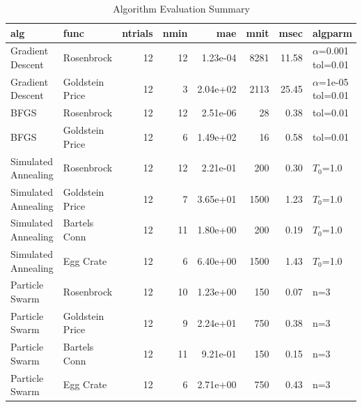\documentclass{vgtc}                          %
\begin{document}
\begin{table}[h]
\caption{Algorithm Evaluation Summary}
\label{tab:algo_eval_sum}
\begin{tabular}{llrrrrrl}
\toprule
                 alg &             func &  ntrials &  nmin &      mae &  mnit &  msec &                  algparm \\
\midrule
    Gradient Descent &       Rosenbrock &       12 &    12 & 1.23e-04 &  8281 & 11.58 &  $\alpha$=0.001 tol=0.01 \\
    Gradient Descent &  Goldstein Price &       12 &     3 & 2.04e+02 &  2113 & 25.45 &  $\alpha$=1e-05 tol=0.01 \\
                BFGS &       Rosenbrock &       12 &    12 & 2.51e-06 &    28 &  0.38 &                 tol=0.01 \\
                BFGS &  Goldstein Price &       12 &     6 & 1.49e+02 &    16 &  0.58 &                 tol=0.01 \\
 Simulated Annealing &       Rosenbrock &       12 &    12 & 2.21e-01 &   200 &  0.30 &                $T_0$=1.0 \\
 Simulated Annealing &  Goldstein Price &       12 &     7 & 3.65e+01 &  1500 &  1.23 &                $T_0$=1.0 \\
 Simulated Annealing &     Bartels Conn &       12 &    11 & 1.80e+00 &   200 &  0.19 &                $T_0$=1.0 \\
 Simulated Annealing &        Egg Crate &       12 &     6 & 6.40e+00 &  1500 &  1.43 &                $T_0$=1.0 \\
      Particle Swarm &       Rosenbrock &       12 &    10 & 1.23e+00 &   150 &  0.07 &                      n=3 \\
      Particle Swarm &  Goldstein Price &       12 &     9 & 2.24e+01 &   750 &  0.38 &                      n=3 \\
      Particle Swarm &     Bartels Conn &       12 &    11 & 9.21e-01 &   150 &  0.15 &                      n=3 \\
      Particle Swarm &        Egg Crate &       12 &     6 & 2.71e+00 &   750 &  0.43 &                      n=3 \\
\bottomrule
\end{tabular}
\end{table}
\end{document}
